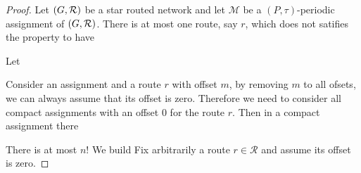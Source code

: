 \documentclass[a4paper,10pt]{article}
\begin{document}
\begin{proof}
Let $(G, {\cal R})$ be a star routed network and let $\mathcal{M}$ be a $(P,\tau)$-periodic assignment of $(G, {\cal R})$.
There is at most one route, say $r$, which does not satifies the property to have 


Let

Consider an assignment and a route $r$ with offset $m$, by removing $m$ to all ofsets,
we can always assume that its offset is zero. Therefore we need to consider all compact assignments 
with an offset $0$ for the route $r$. Then in a compact assignment there 

There is at most $n!$
We build
Fix arbitrarily a route $r \in \mathcal{R}$ and assume its offset is zero.


\end{proof}
\end{document}
